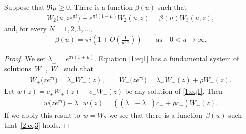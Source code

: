 \begin{Lemma}\label{2:l2}
Suppose that $\Re\mu\ge 0$. There is a function $\beta(u)$ such that
\begin{gather}\label{2:eq3}
 W_2\big(u,ze^{\pi i}\big)-e^{\pi i(1-\mu)}W_2(u,z)= \beta(u) W_3(u,z) ,
\end{gather}
and, for every $N=1,2,3,\dots$,
\begin{gather}\label{2:beta}
 \beta(u)=\pi i\left(1+O\left(\frac{1}{u^{2N}}\right)\right)\qquad\text{as}\quad 0<u\to\infty.
 \end{gather}
\end{Lemma}
\begin{proof}
We set $\lambda_\pm=e^{\pi i(1\pm\mu)}$. Equation \eqref{1:eq1} has a fundamental system of solutions~$W_+$,~$W_-$ such that
\begin{gather*}
W_+\big(ze^{\pi i}\big)=\lambda_+ W_+(z),\qquad
W_-\big(ze^{\pi i}\big)=\lambda_- W_-(z)+\rho W_+(z) .
\end{gather*}
Let $w(z)=c_+W_+(z)+c_-W_-(z)$ be any solution of \eqref{1:eq1}.
Then
\begin{gather*}
w\big(ze^{\pi i}\big)-\lambda_- w(z)=((\lambda_+-\lambda_-)c_++\rho c_-) W_+(z).
\end{gather*}
If we apply this result to $w=W_2$ we see that there is a function~$\beta(u)$ such that~\eqref{2:eq3} holds.


\end{proof}
